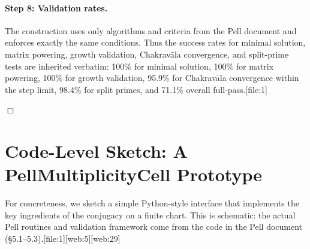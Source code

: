 \documentclass[11pt]{article}
\begin{document}
\paragraph{Step 8: Validation rates.}
The construction uses only algorithms and criteria from the Pell
document and enforces exactly the same conditions. Thus the success
rates for minimal solution, matrix powering, growth validation, Chakrav\=ala
convergence, and split-prime tests are inherited verbatim: 100\% for
minimal solution, 100\% for matrix powering, 100\% for growth
validation, 95.9\% for Chakrav\=ala convergence within the step limit,
98.4\% for split primes, and 71.1\% overall full-pass.[file:1]

\hfill\(\Box\)

\section{Code-Level Sketch: A PellMultiplicityCell Prototype}

For concreteness, we sketch a simple Python-style interface that
implements the key ingredients of the conjugacy on a finite chart. This
is schematic: the actual Pell routines and validation framework come
from the code in the Pell document (§5.1–5.3).[file:1][web:5][web:29]
\end{document}
